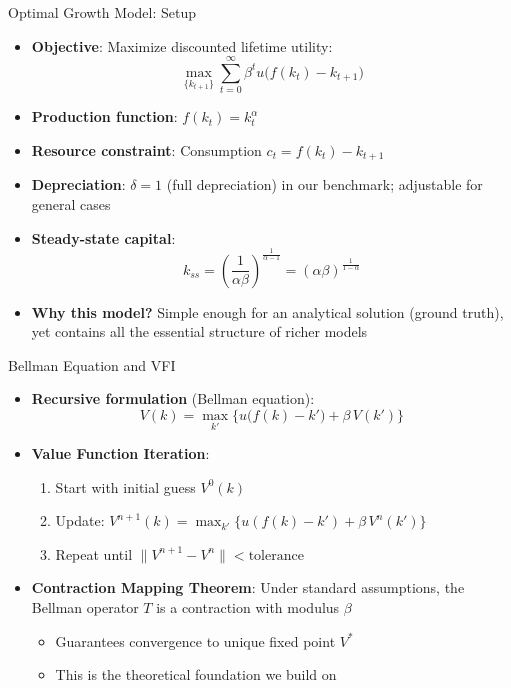 \documentclass[10pt,english,aspectratio=169]{beamer}
\begin{document}
\begin{frame}{Optimal Growth Model: Setup}
\begin{itemize}
  \item \textbf{Objective}: Maximize discounted lifetime utility:
    \[
      \max_{\{k_{t+1}\}} \sum_{t=0}^{\infty} \beta^t u\Big(f(k_t) - k_{t+1}\Big)
    \]
  \item \textbf{Production function}: $f(k_t) = k_t^\alpha$
  \item \textbf{Resource constraint}: Consumption $c_t = f(k_t) - k_{t+1}$
  \item \textbf{Depreciation}: $\delta = 1$ (full depreciation) in our benchmark; adjustable for general cases
  \medskip
  \item \textbf{Steady-state capital}:
    \[
      k_{ss} = \left(\frac{1}{\alpha\beta}\right)^{\frac{1}{\alpha - 1}} = (\alpha\beta)^{\frac{1}{1-\alpha}}
    \]
  \medskip
  \item \textbf{Why this model?} Simple enough for an analytical solution (ground truth), yet contains all the essential structure of richer models
\end{itemize}
\end{frame}

\begin{frame}{Bellman Equation and VFI}
\begin{itemize}
  \item \textbf{Recursive formulation} (Bellman equation):
    \[
      V(k) = \max_{k'} \Big\{ u\big(f(k) - k'\big) + \beta\, V(k') \Big\}
    \]
  \item \textbf{Value Function Iteration}:
    \begin{enumerate}
      \item Start with initial guess $V^0(k)$
      \item Update: $V^{n+1}(k) = \max_{k'}\{u(f(k) - k') + \beta\, V^n(k')\}$
      \item Repeat until $\|V^{n+1} - V^n\| < \text{tolerance}$
    \end{enumerate}
  \medskip
  \item \textbf{Contraction Mapping Theorem}: Under standard assumptions, the Bellman operator $T$ is a contraction with modulus $\beta$
    \begin{itemize}
      \item Guarantees convergence to unique fixed point $V^*$
      \item This is the theoretical foundation we build on
    \end{itemize}
\end{itemize}
\end{frame}
\end{document}
